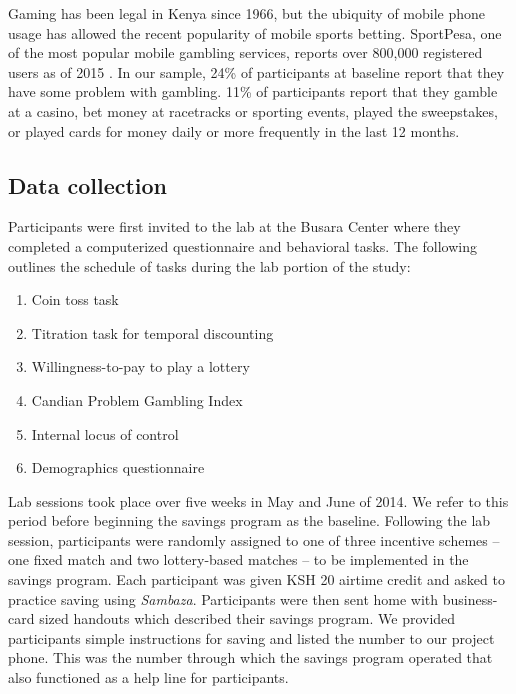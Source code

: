 \documentclass[12pt]{article}
\begin{document}
		Gaming has been legal in Kenya since 1966, but the ubiquity of mobile phone usage has allowed the recent popularity of mobile sports betting. SportPesa, one of the most popular mobile gambling services, reports over 800,000 registered users as of 2015 . In our sample, 24\% of participants at baseline report that they have some problem with gambling. 11\% of participants report that they gamble at a casino, bet money at racetracks or sporting events, played the sweepstakes, or played cards for money daily or more frequently in the last 12 months.

	\subsection{Data collection}

		Participants were first invited to the lab at the Busara Center where they completed a computerized questionnaire and behavioral tasks. The following outlines the schedule of tasks during the lab portion of the study:

		\begin{enumerate}
		\item Coin toss task 
		\item Titration task for temporal discounting 
		\item Willingness-to-pay to play a lottery
		\item Candian Problem Gambling Index 
		\item Internal locus of control 
		\item Demographics questionnaire
		\end{enumerate}

		Lab sessions took place over five weeks in May and June of 2014. We refer to this period before beginning the savings program as the baseline. Following the lab session, participants were randomly assigned to one of three incentive schemes -- one fixed match and two lottery-based matches -- to be implemented in the savings program. Each participant was given KSH 20 airtime credit and asked to practice saving using \textit{Sambaza}. Participants were then sent home with business-card sized handouts which described their savings program. We provided participants simple instructions for saving and listed the number to our project phone. This was the number through which the savings program operated that also functioned as a help line for participants.
\end{document}
